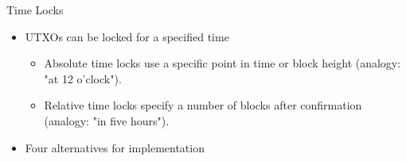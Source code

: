 \documentclass[handout]{beamer}
\begin{document}
\begin{frame}{Time Locks}
	\begin{itemize}
		\item<1-> UTXOs can be locked for a specified time
		\begin{itemize}
			\item<1-> Absolute time locks use a specific point in time or block height (analogy: "at 12 o'clock").
			\item<1-> Relative time locks specify a number of blocks after confirmation (analogy: "in five hours").
		\end{itemize}
		\item<2 -> Four alternatives for implementation
	\end{itemize}
	\vspace{0.25cm}
\end{frame}

\end{document}
